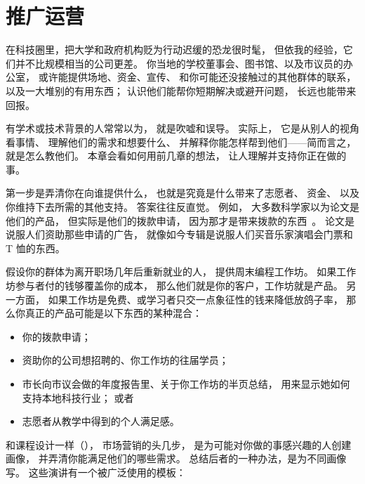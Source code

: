 \chapter{推广运营}\label{s:outreach}

在科技圈里，把大学和政府机构贬为行动迟缓的恐龙很时髦，
但依我的经验，它们并不比规模相当的公司更差。
你当地的学校董事会、图书馆、以及市议员的办公室，
或许能提供场地、资金、宣传、
和你可能还没接触过的其他群体的联系，
以及一大堆别的有用东西；
认识他们能帮你短期解决或避开问题，
长远也能带来回报。


有学术或技术背景的人常常以为，
就是吹嘘和误导。
实际上，
它是从别人的视角看事情、
理解他们的需求和想要什么、
并解释你能怎样帮到他们——简而言之，
就是怎么教他们。
本章会看如何用前几章的想法，
让人理解并支持你正在做的事。

第一步是弄清你在向谁提供什么，
也就是究竟是什么带来了志愿者、
资金、
以及你维持下去所需的其他支持。
答案往往反直觉。
例如，
大多数科学家以为论文是他们的产品，
但实际是他们的拨款申请，
因为那才是带来拨款的东西~\cite{Kuch2011}。
论文是说服人们资助那些申请的广告，
就像如今专辑是说服人们买音乐家演唱会门票和 T 恤的东西。

假设你的群体为离开职场几年后重新就业的人，
提供周末编程工作坊。
如果工作坊参与者付的钱够覆盖你的成本，
那么他们就是你的客户，工作坊就是产品。
另一方面，
如果工作坊是免费、或学习者只交一点象征性的钱来降低放鸽子率，
那么你真正的产品可能是以下东西的某种混合：

\begin{itemize}

\item
  你的拨款申请；

\item
  资助你的公司想招聘的、你工作坊的往届学员；

\item
  市长向市议会做的年度报告里、关于你工作坊的半页总结，
  用来显示她如何支持本地科技行业；
  或者

\item
  志愿者从教学中得到的个人满足感。

\end{itemize}

和课程设计一样（），
市场营销的头几步，
是为可能对你做的事感兴趣的人创建画像，
并弄清你能满足他们的哪些需求。
总结后者的一种办法，是为不同画像写。
这些演讲有一个被广泛使用的模板：

